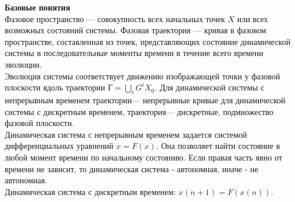 \newcommand{\colontitulAutors}{astronom\_v\_cube,~edombek}
\newcommand{\colontitulYear}{2022}
\newcommand{\colontitulEducationalSubject}{Теория колебаний}
\newcommand{\colontitulTeacher}{Некоркин В.И.}




	\small
	\begin{multicols*}{2}
		\textbf{Базовые понятия}\\
		Фазовое пространство — совокупность всех начальных точек $X$ или всех возможных состояний системы. Фазовая траектория — кривая в фазовом пространстве, составленная из точек, представляющих состояние динамической системы в последовательные моменты времени в течение всего времени эволюции.\\
		Эволюция системы соответствует движению изображающей точки у фазовой плоскости вдоль траектории $\text{Г} = \bigcup_t G^t X_0$. Для динамической системы с непрерывным временем траектории— непрерывные кривые для динамической системы с дискретным временем, траектория— дискретные, подмножество фазовой плоскости.\\
		Динамическая система с непрерывным временем задается системой дифференциальных уравнений $\dot{x} = F(x)$. Она позволяет найти состояние в любой момент времени по начальному состоянию.
		Если правая часть явно от времени не зависит, то динамическая система -  автономная, иначе - не автономная.\\
		Динамическая система с дискретным временем: $x(n+1) = F(x(n))$.
		

\end{multicols*}
